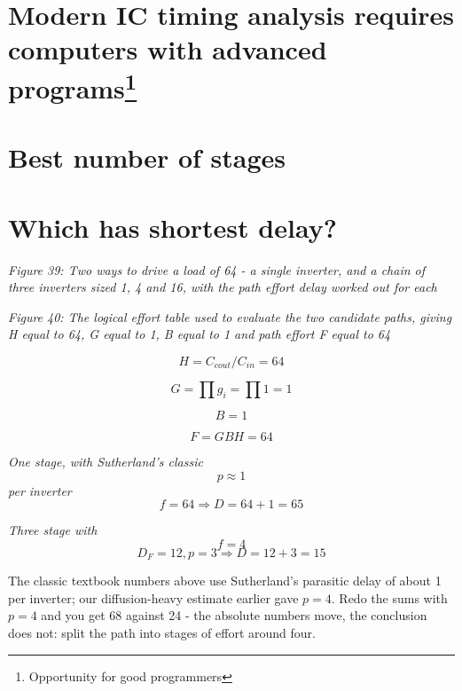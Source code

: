 \section[Modern IC timing analysis requires computers with advanced
programs]{\texorpdfstring{Modern IC timing analysis requires computers
with advanced
programs\footnote{Opportunity for good programmers}}{Modern IC timing analysis requires computers with advanced programs}}\label{modern-ic-timing-analysis-requires-computers-with-advanced-programs2}

\section{Best number of stages}\label{best-number-of-stages}

\section{Which has shortest delay?}\label{which-has-shortest-delay}


{
\centering
{}
}

\emph{Figure 39: Two ways to drive a load of 64 - a single inverter, and
a chain of three inverters sized 1, 4 and 16, with the path effort delay
worked out for each}


{
\centering
{}
}

\emph{Figure 40: The logical effort table used to evaluate the two
candidate paths, giving H equal to 64, G equal to 1, B equal to 1 and
path effort F equal to 64}

\[H = C_{cout}/C_{in} = 64 \]

\[G = \prod{g_i} = \prod{1} = 1\]

\[B = 1\]

\[F = GBH = 64\]

\emph{One stage, with Sutherland's classic \[p \approx 1\] per inverter}
\[f = 64 \Rightarrow D = 64 + 1 = 65\]

\emph{Three stage with \[f=4\]}
\[D_F = 12, p = 3 \Rightarrow D = 12 + 3 = 15\]

The classic textbook numbers above use Sutherland's parasitic delay of
about 1 per inverter; our diffusion-heavy estimate earlier gave
\(p = 4\). Redo the sums with \(p = 4\) and you get 68 against 24 - the
absolute numbers move, the conclusion does not: split the path into
stages of effort around four.

